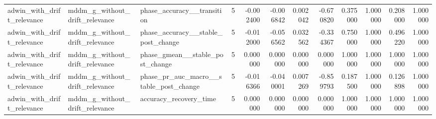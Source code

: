 \begin{tabular}{lllrrrrrrrrr}
adwin\_with\_drift\_relevance & mddm\_g\_without\_drift\_relevance & phase\_accuracy\_\_transition & 5 & -0.002400 & -0.006842 & 0.002042 & -0.670820 & 0.375000 & 1.000000 & 0.208000 & 1.000000 \\
adwin\_with\_drift\_relevance & mddm\_g\_without\_drift\_relevance & phase\_accuracy\_\_stable\_post\_change & 5 & -0.012000 & -0.056562 & 0.032562 & -0.334367 & 0.750000 & 1.000000 & 0.496220 & 1.000000 \\
adwin\_with\_drift\_relevance & mddm\_g\_without\_drift\_relevance & phase\_gmean\_\_stable\_post\_change & 5 & 0.000000 & 0.000000 & 0.000000 & 0.000000 & 1.000000 & 1.000000 & 1.000000 & 1.000000 \\
adwin\_with\_drift\_relevance & mddm\_g\_without\_drift\_relevance & phase\_pr\_auc\_macro\_\_stable\_post\_change & 5 & -0.016366 & -0.040001 & 0.007269 & -0.859793 & 0.187500 & 1.000000 & 0.126898 & 1.000000 \\
adwin\_with\_drift\_relevance & mddm\_g\_without\_drift\_relevance & accuracy\_recovery\_time & 5 & 0.000000 & 0.000000 & 0.000000 & 0.000000 & 1.000000 & 1.000000 & 1.000000 & 1.000000 \\
\bottomrule
\end{tabular}
